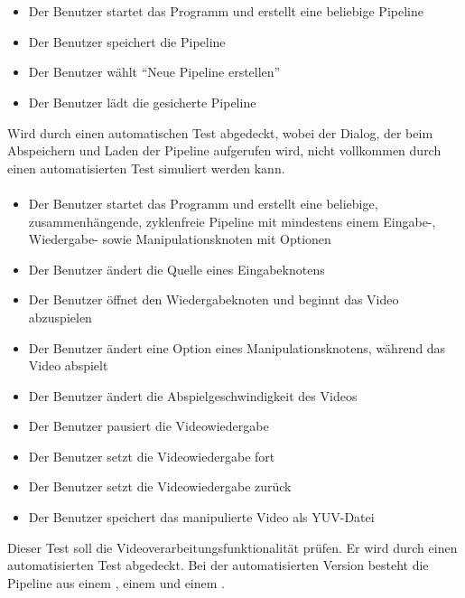 \paragraph{} ~\\

\begin{itemize}
	\item Der Benutzer startet das Programm und erstellt eine beliebige Pipeline
	\item Der Benutzer speichert die Pipeline
	\item Der Benutzer wählt ``Neue Pipeline erstellen''
	\item Der Benutzer lädt die gesicherte Pipeline
\end{itemize}
Wird durch einen automatischen Test abgedeckt, wobei der Dialog, der beim Abspeichern und Laden der Pipeline aufgerufen wird, nicht vollkommen durch einen automatisierten Test simuliert werden kann.

\paragraph{}

\begin{itemize}
	\item Der Benutzer startet das Programm und erstellt eine beliebige, zusammenhängende, zyklenfreie Pipeline mit mindestens einem Eingabe-, Wiedergabe- sowie Manipulationsknoten mit Optionen
	\item Der Benutzer ändert die Quelle eines Eingabeknotens
	\item Der Benutzer öffnet den Wiedergabeknoten und beginnt das Video abzuspielen
	\item Der Benutzer ändert eine Option eines Manipulationsknotens, während das Video abspielt
	\item Der Benutzer ändert die Abspielgeschwindigkeit des Videos
	\item Der Benutzer pausiert die Videowiedergabe
	\item Der Benutzer setzt die Videowiedergabe fort
	\item Der Benutzer setzt die Videowiedergabe zurück
	\item Der Benutzer speichert das manipulierte Video als YUV-Datei
\end{itemize}
Dieser Test soll die Videoverarbeitungsfunktionalität prüfen. Er wird durch einen automatisierten Test abgedeckt. Bei der automatisierten Version besteht die Pipeline aus einem , einem  und einem .

